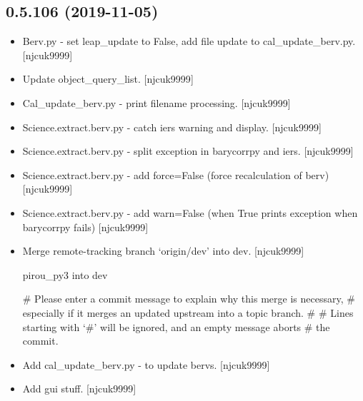 \documentclass[a4paper,10pt,english]{report}
\begin{document}
\subsection{0.5.106 (2019-11-05)}
\label{\detokenize{misc/changelog:id35}}\begin{itemize}
\item {} 
Berv.py - set leap\_update to False, add file update to
cal\_update\_berv.py. {[}njcuk9999{]}

\item {} 
Update object\_query\_list. {[}njcuk9999{]}

\item {} 
Cal\_update\_berv.py - print filename processing. {[}njcuk9999{]}

\item {} 
Science.extract.berv.py - catch iers warning and display. {[}njcuk9999{]}

\item {} 
Science.extract.berv.py - split exception in barycorrpy and iers.
{[}njcuk9999{]}

\item {} 
Science.extract.berv.py - add force=False (force recalculation of
berv) {[}njcuk9999{]}

\item {} 
Science.extract.berv.py - add warn=False (when True prints exception
when barycorrpy fails) {[}njcuk9999{]}

\item {} 
Merge remote-tracking branch ‘origin/dev’ into dev. {[}njcuk9999{]}

pirou\_py3 into dev

\# Please enter a commit message to explain why this merge is necessary,
\# especially if it merges an updated upstream into a topic branch.
\#
\# Lines starting with ‘\#’ will be ignored, and an empty message aborts
\# the commit.

\item {} 
Add cal\_update\_berv.py - to update bervs. {[}njcuk9999{]}

\item {} 
Add gui stuff. {[}njcuk9999{]}

\end{itemize}
\end{document}
